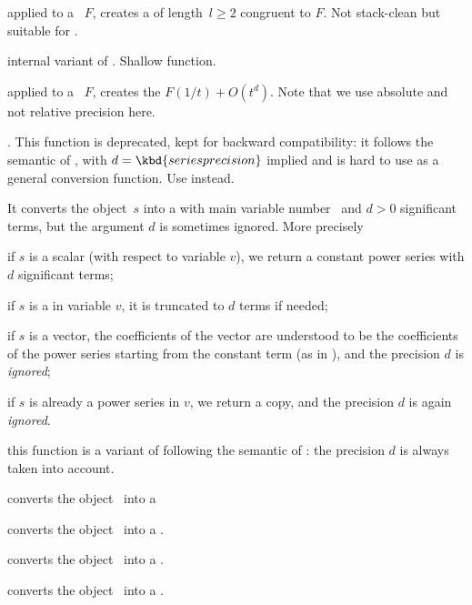  applied to a ~$F$,
creates a  of length~$l\geq 2$ congruent to $F$. Not stack-clean
but suitable for .

 internal variant of
. Shallow function.

 applied to a
~$F$, creates the  $F(1/t) + O(t^d)$. Note that
we use absolute and not relative precision here.

. This function is deprecated,
kept for backward compatibility: it follows the semantic of ,
with $d = \kbd{seriesprecision}$ implied and is hard to use as a general
conversion function. Use  instead.

It converts the object~$s$ into a  with main variable number~
and $d > 0$ significant terms, but the argument $d$ is sometimes ignored.
More precisely

\item if $s$ is a scalar (with respect to variable $v$),  we return a
constant power series with $d$ significant terms;

\item if $s$ is a  in variable $v$, it is truncated to $d$ terms if
needed;

\item if $s$ is a vector, the coefficients of the vector  are understood to
be the coefficients of the power series starting from the constant term (as
in ), and the precision $d$ is \emph{ignored};

\item if $s$ is already a power series in $v$, we return a copy, and
the precision $d$ is again \emph{ignored}.

 this function is a variant of
 following the semantic of : the precision $d$
is always taken into account.

 converts the object~ into a 

 converts the object~ into a .

 converts the object~ into a .

 converts the object~ into a
.

